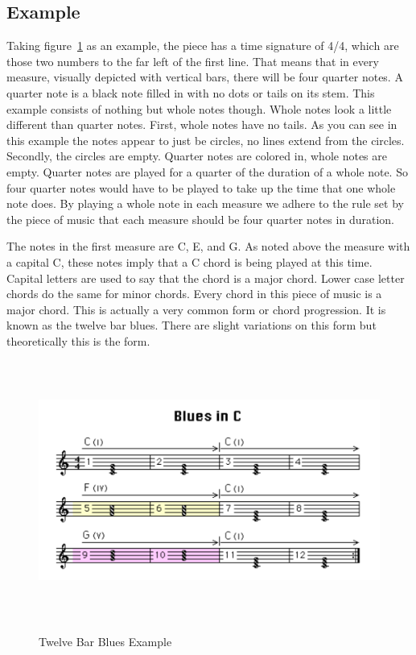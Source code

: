 \documentclass[12pt]{ucthesis}
\newcommand{\captionfonts}{\small\bf\ssp}
\begin{document}
\subsection{Example}

Taking figure~\ref{fig:blues-example} as an example, the piece has a time signature of 4/4, which are those two numbers to the far left of the first line. That means that in every measure, visually depicted with vertical bars, there will be four quarter notes. A quarter note is a black note filled in with no dots or tails on its stem. This example consists of nothing but whole notes though. Whole notes look a little different than quarter notes. First, whole notes have no tails. As you can see in this example the notes appear to just be circles, no lines extend from the circles. Secondly, the circles are empty. Quarter notes are colored in, whole notes are empty. Quarter notes are played for a quarter of the duration of a whole note. So four quarter notes would have to be played to take up the time that one whole note does. By playing a whole note in each measure we adhere to the rule set by the piece of music that each measure should be four quarter notes in duration.

The notes in the first measure are C, E, and G. As noted above the measure with a capital C, these notes imply that a C chord is being played at this time. Capital letters are used to say that the chord is a major chord. Lower case letter chords do the same for minor chords. Every chord in this piece of music is a major chord. This is actually a very common form or chord progression. It is known as the twelve bar blues. There are slight variations on this form but theoretically this is the form. 

\begin{figure}
\includegraphics[height=85mm]{blues-example.pdf}
\captionfonts
\caption[Twelve Bar Blues Example]{Twelve Bar Blues Example}
\label{fig:blues-example}
\end{figure}
\end{document}
